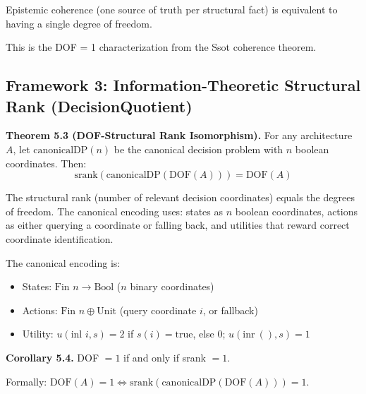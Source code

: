 \begin{informal}
Epistemic coherence (one source of truth per structural fact) is equivalent to having a single degree of freedom.
\end{informal}


This is the DOF = 1 characterization from the Ssot coherence theorem.

\subsection{Framework 3: Information-Theoretic Structural Rank (DecisionQuotient)}

\begin{formal}
\textbf{Theorem 5.3 (DOF-Structural Rank Isomorphism).} For any architecture $A$, let $\text{canonicalDP}(n)$ be the canonical decision problem with $n$ boolean coordinates. Then:
\[
\text{srank}(\text{canonicalDP}(\text{DOF}(A))) = \text{DOF}(A)
\]
\end{formal}

\begin{informal}
The structural rank (number of relevant decision coordinates) equals the degrees of freedom. The canonical encoding uses: states as $n$ boolean coordinates, actions as either querying a coordinate or falling back, and utilities that reward correct coordinate identification.
\end{informal}

The canonical encoding is:
\begin{itemize}
\item States: $\text{Fin } n \to \text{Bool}$ ($n$ binary coordinates)
\item Actions: $\text{Fin } n \oplus \text{Unit}$ (query coordinate $i$, or fallback)
\item Utility: $u(\text{inl } i, s) = 2$ if $s(i) = \text{true}$, else $0$; $u(\text{inr}\ (), s) = 1$
\end{itemize}


\begin{formal}
\textbf{Corollary 5.4.} DOF $= 1$ if and only if srank $= 1$.

Formally: $\text{DOF}(A) = 1 \iff \text{srank}(\text{canonicalDP}(\text{DOF}(A))) = 1$.
\end{formal}

